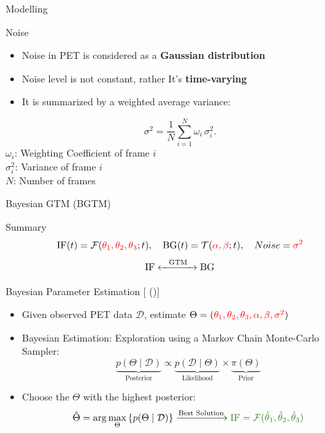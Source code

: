 \documentclass[aspectratio=169]{beamer}
\newcommand{\citeauthoryear}[1]{\citeauthor{#1} (\citeyear{#1})}
\begin{document}
\begin{frame}{Modelling}
	\begin{block}{Noise}
		\begin{itemize}
			\setlength\itemsep{1.5em}
            \item Noise in PET is considered as a \textbf{Gaussian distribution}
            \item Noise level is not constant, rather It's \textbf{time-varying}
			\item It is summarized by a weighted average variance:
		\end{itemize}
		\[
			\sigma^2 = \frac{1}{N} \sum_{i=1}^{N} \omega_i\,\sigma_i^2.
		\]
		\(\omega_i\): Weighting Coefficient of frame $i$\\[1.5em]
		\(\sigma_i^2\): Variance of frame $i$\\[1.5em]
		$N$: Number of frames
	\end{block}
\end{frame}



\begin{frame}[t]{Bayesian GTM (BGTM)}
	\begin{block}{Summary}
		\[
			\text{IF}(t) = \mathcal{F}(\textcolor{red}{\theta_1,\theta_2,\theta_3};t),
			\quad \text{BG}(t)=\mathcal{T}(\textcolor{red}{\alpha,\beta};t),
			\quad Noise=\textcolor{red}{\sigma^2}
		\]
		\[
			\text{IF} \xleftrightarrow{\text{\quad GTM\quad}} \text{BG}
		\]
	\end{block}
	\pause
    \begin{block}{Bayesian Parameter Estimation [\citeauthoryear{irace2020bayesian}]}
		\small
		\begin{itemize}
			\item<2-> Given observed PET data $\mathcal{D}$, estimate $\Theta=(\textcolor{red}{\theta_1, \theta_2, \theta_3, \alpha, \beta,\sigma^2})$
			\item<3-> Bayesian Estimation: Exploration using a Markov Chain Monte-Carlo Sampler:
			      \[
				      \underbrace{p(\Theta \mid \mathcal{D})}_{\text{Posterior}} \propto \underbrace{p(\mathcal{D} \mid \Theta)}_{\text{Likelihood}} \times \underbrace{\pi(\Theta)}_{\text{Prior}}
			      \]
			\item<4-> Choose the $\Theta$ with the highest posterior:
			      \[
				      \hat{\Theta} = \arg\max_{\Theta} \left\{ p(\Theta \mid \mathcal{D}) \right\}
				      \xrightarrow{\text{Best Solution}}
				      \textcolor{OliveGreen}{\text{IF} = \mathcal{F}(\hat{\theta}_1, \hat{\theta}_2, \hat{\theta}_3)}
			      \]
		\end{itemize}
	\end{block}
\end{frame}
\end{document}
